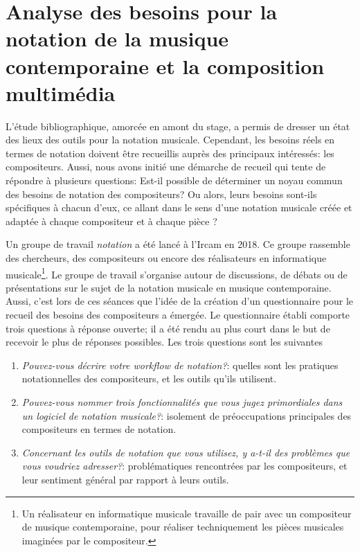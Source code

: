 \section{Analyse des besoins pour la notation de la musique contemporaine et la composition multimédia}
\label{sec:analyseBesoins}

L'étude bibliographique, amorcée en amont du stage, a permis de dresser un état des lieux des outils pour la notation musicale. Cependant, les besoins réels en termes de notation doivent être recueillis auprès des principaux intéressés: les compositeurs. Aussi, nous avons initié une démarche de recueil qui tente de répondre à plusieurs questions: Est-il possible de déterminer un noyau commun des besoins de notation des compositeurs? Ou alors, leurs besoins sont-ils spécifiques à chacun d'eux, ce allant dans le sens d'une notation musicale créée et adaptée à chaque compositeur et à chaque pièce \cite{bosseur2005}?

Un groupe de travail \textit{notation} a été lancé à l'Ircam en 2018. Ce groupe rassemble des chercheurs, des compositeurs ou encore des réalisateurs en informatique musicale\footnote{Un réalisateur en informatique musicale travaille de pair avec un compositeur de musique contemporaine, pour réaliser techniquement les pièces musicales imaginées par le compositeur.}. Le groupe de travail s'organise autour de discussions, de débats ou de présentations sur le sujet de la notation musicale en musique contemporaine. Aussi, c'est lors de ces séances que l'idée de la création d'un questionnaire pour le recueil des besoins des compositeurs a émergée.
Le questionnaire établi comporte trois questions à réponse ouverte; il a été rendu au plus court dans le but de recevoir le plus de réponses possibles. Les trois questions sont les suivantes
\begin{enumerate}[label={(\arabic*)}]
	\item \textit{Pouvez-vous décrire votre workflow de notation?}: quelles sont les pratiques notationnelles des compositeurs, et les outils qu'ils utilisent.
	\item \textit{Pouvez-vous nommer trois fonctionnalités que vous jugez primordiales dans un logiciel de notation musicale?}: isolement de préoccupations principales des compositeurs en termes de notation.
	\item \textit{Concernant les outils de notation que vous utilisez, y a-t-il des problèmes que vous voudriez adresser?}: problématiques rencontrées par les compositeurs, et leur sentiment général par rapport à leurs outils.  
\end{enumerate}

